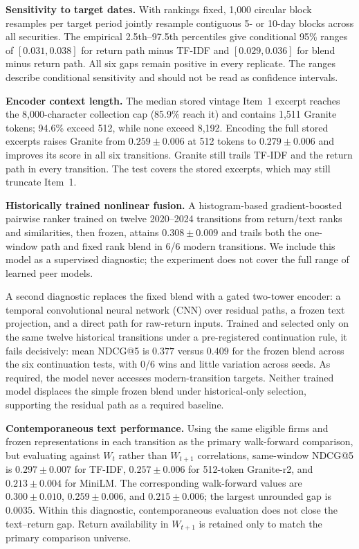 \documentclass[sigconf,anonymous]{acmart}
\begin{document}
\textbf{Sensitivity to target dates.}
With rankings fixed, 1{,}000 circular block resamples per target period jointly
resample contiguous 5- or 10-day blocks across all securities.  The empirical
2.5th--97.5th percentiles give conditional 95\% ranges of
$[0.031,0.038]$ for return path minus TF-IDF and $[0.029,0.036]$ for blend
minus return path.  All six gaps remain positive in every replicate.  The ranges
describe conditional sensitivity and should not be read as confidence intervals.

\textbf{Encoder context length.}
The median stored vintage Item~1 excerpt reaches the 8,000-character
collection cap (85.9\% reach it) and contains 1,511 Granite tokens;
94.6\% exceed 512, while none exceed 8,192.  Encoding the full stored excerpts
raises Granite from $0.259\pm0.006$ at 512 tokens to $0.279\pm0.006$ and improves
its score in all six transitions.  Granite still trails TF-IDF and the return
path in every transition.  The test covers the stored excerpts, which may still
truncate Item~1.

\textbf{Historically trained nonlinear fusion.}
A histogram-based gradient-boosted pairwise ranker trained on twelve 2020--2024
transitions from return/text ranks and similarities, then frozen, attains
$0.308\pm0.009$ and trails both the one-window path and fixed rank blend in
6/6 modern transitions.  We include this model as a supervised diagnostic; the
experiment does not cover the full range of learned peer models.

A second diagnostic replaces the fixed blend with a gated two-tower encoder: a
temporal convolutional neural network (CNN) over residual paths, a frozen text
projection, and a direct path for raw-return inputs.  Trained and selected only
on the same twelve historical transitions under a pre-registered continuation
rule, it fails decisively:
mean NDCG@5 is $0.377$ versus $0.409$ for the frozen blend across the six
continuation tests, with 0/6 wins and little variation across seeds.  As
required, the model never accesses modern-transition targets.
Neither trained model displaces the simple frozen blend under historical-only
selection, supporting the residual path as a required baseline.

\textbf{Contemporaneous text performance.}
Using the same eligible firms and frozen representations in each transition as
the primary walk-forward comparison, but evaluating against
$W_t$ rather than $W_{t+1}$ correlations, same-window NDCG@5 is
$0.297\pm0.007$ for TF-IDF, $0.257\pm0.006$ for 512-token Granite-r2, and
$0.213\pm0.004$ for MiniLM.  The corresponding walk-forward values are
$0.300\pm0.010$, $0.259\pm0.006$, and $0.215\pm0.006$; the largest unrounded
gap is $0.0035$.  Within this diagnostic, contemporaneous evaluation does not
close the text--return gap.  Return availability in
$W_{t+1}$ is retained only to match the primary comparison universe.
\end{document}
